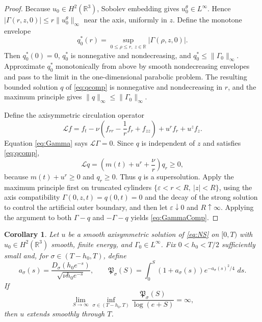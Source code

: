 \documentclass[11pt]{article}
\numberwithin{equation}{section}
\newtheorem{corollary}[corollary]{Corollary}
\theoremstyle{definition}
\newcommand{\R}{\mathbb R}
\newcommand{\dd}{\,d}
\newcommand{\Gam}{\Gamma}
\begin{document}
\begin{proof}
Because $u_0\in H^2(\R^3)$, Sobolev embedding gives $u_0^\theta\in L^\infty$.  Hence
$|\Gam(r,z,0)|\le r\|u_0^\theta\|_\infty$ near the axis, uniformly in $z$.  Define the monotone envelope
\[
 q_0^*(r)=\sup_{0\le\rho\le r,\ z\in\R}|\Gam(\rho,z,0)|.
\]
Then $q_0^*(0)=0$, $q_0^*$ is nonnegative and nondecreasing, and
$q_0^*\le\|\Gam_0\|_\infty$.  Approximate $q_0^*$ monotonically from above by smooth nondecreasing envelopes and pass to the limit in the one-dimensional parabolic problem.  The resulting bounded solution $q$ of \eqref{eq:qcomp} is nonnegative and nondecreasing in $r$, and the maximum principle gives
$\|q\|_\infty\le\|\Gam_0\|_\infty$.

Define the axisymmetric circulation operator
\[
 \mathcal L f
 =f_t-\nu\left(f_{rr}-\frac1r f_r+f_{zz}\right)
 +u^rf_r+u^zf_z.
\]
Equation \eqref{eq:Gamma} says $\mathcal L\Gam=0$.  Since $q$ is independent of $z$ and satisfies \eqref{eq:qcomp},
\[
 \mathcal L q
 =\left(m(t)+u^r+\frac\nu r\right)q_r\ge0,
\]
because $m(t)+u^r\ge0$ and $q_r\ge0$.  Thus $q$ is a supersolution.  Apply the maximum principle first on truncated cylinders
$\{\varepsilon<r<R,\ |z|<R\}$, using the axis compatibility $\Gam(0,z,t)=q(0,t)=0$ and the decay of the strong solution to control the artificial outer boundary, and then let $\varepsilon\downarrow0$ and $R\uparrow\infty$.  Applying the argument to both $\Gam-q$ and $-\Gam-q$ yields \eqref{eq:GammaComp}.
\end{proof}

\begin{corollary}\label{thm:petro-integral}
Let $u$ be a smooth axisymmetric solution of \eqref{eq:NS} on $[0,T)$ with $u_0\in H^2(\R^3)$ smooth, finite energy, and $\Gamma_0\in L^\infty$.  Fix $0<h_0<T/2$ sufficiently small and, for $\sigma\in(T-h_0,T)$, define
\[
 a_\sigma(s)=
 \frac{D_\sigma(h_0e^{-s})}{\sqrt{\nu h_0e^{-s}}},
 \qquad
 \mathfrak P_\sigma(S)=
 \int_0^S(1+a_\sigma(s))e^{-a_\sigma(s)^2/4}\,\dd s.
\]
If
\begin{equation}\label{eq:petro-integral-NS}
 \lim_{S\to\infty}
 \inf_{\sigma\in(T-h_0,T)}
 \frac{\mathfrak P_\sigma(S)}{\log(e+S)}=\infty,
\end{equation}
then $u$ extends smoothly through $T$.
\end{corollary}
\end{document}
